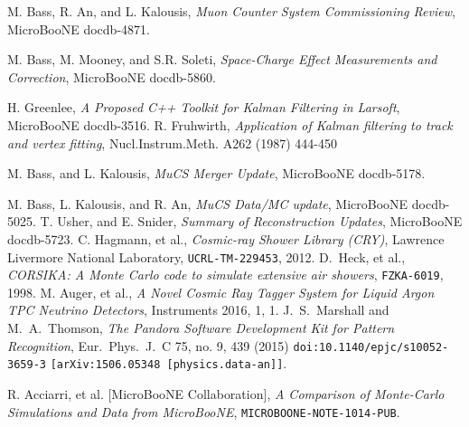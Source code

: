 \documentclass[a4paper]{scrartcl}
\begin{document}
\begin{thebibliography}{9}
 M. Bass, R. An, and L. Kalousis, \textit{Muon Counter System Commissioning Review}, MicroBooNE docdb-4871.

 M. Bass, M. Mooney, and S.R. Soleti, \textit{Space-Charge Effect Measurements and Correction}, MicroBooNE docdb-5860.

 H. Greenlee, \textit{A Proposed C++ Toolkit for Kalman Filtering in Larsoft}, MicroBooNE docdb-3516.
 R. Fruhwirth, \textit{Application of Kalman filtering to track and vertex fitting}, Nucl.Instrum.Meth. A262 (1987) 444-450

 M. Bass, and L. Kalousis, \textit{MuCS Merger Update}, MicroBooNE docdb-5178.

 M. Bass, L. Kalousis, and R. An, \textit{MuCS Data/MC update}, MicroBooNE docdb-5025.
 T. Usher, and E. Snider, \textit{Summary of Reconstruction Updates}, MicroBooNE docdb-5723.
 C. Hagmann, et al., \textit{Cosmic-ray Shower Library (CRY)},  Lawrence Livermore National Laboratory, \texttt{UCRL-TM-229453}, 2012.
 D.~Heck, et al.,
  \textit{CORSIKA: A Monte Carlo code to simulate extensive air showers},
  \texttt{FZKA-6019}, 1998.
 M. Auger, et al., \textit{A Novel Cosmic Ray Tagger System for Liquid Argon TPC Neutrino Detectors}, Instruments 2016, 1, 1.
J.~S.~Marshall and M.~A.~Thomson,
  \textit{The Pandora Software Development Kit for Pattern Recognition},
  Eur.\ Phys.\ J.\ C 75, no. 9, 439 (2015)
  \texttt{doi:10.1140/epjc/s10052-3659-3}
  \texttt{[arXiv:1506.05348 [physics.data-an]]}.
  
R. Acciarri, et al. [MicroBooNE Collaboration], \textit{A Comparison of Monte-Carlo Simulations and Data from MicroBooNE}, \texttt{MICROBOONE-NOTE-1014-PUB}.
\end{thebibliography}
\end{document}
